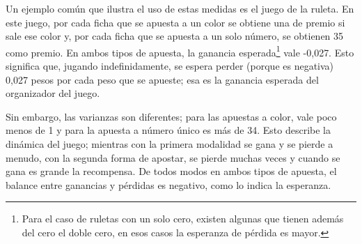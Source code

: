 \documentclass[]{article}
\let\rmarkdownfootnote\footnote%
\def\footnote{\protect\rmarkdownfootnote}
\begin{document}
Un ejemplo común que ilustra el uso de estas medidas es el juego de la
ruleta. En este juego, por cada ficha que se apuesta a un color se
obtiene una de premio si sale ese color y, por cada ficha que se apuesta
a un solo número, se obtienen 35 como premio. En ambos tipos de apuesta,
la ganancia esperada\footnote{Para el caso de ruletas con un solo cero,
  existen algunas que tienen además del cero el doble cero, en esos
  casos la esperanza de pérdida es mayor.} vale -0,027. Esto significa
que, jugando indefinidamente, se espera perder (porque es negativa)
0,027 pesos por cada peso que se apueste; esa es la ganancia esperada
del organizador del juego.

Sin embargo, las varianzas son diferentes; para las apuestas a color,
vale poco menos de 1 y para la apuesta a número único es más de 34. Esto
describe la dinámica del juego; mientras con la primera modalidad se
gana y se pierde a menudo, con la segunda forma de apostar, se pierde
muchas veces y cuando se gana es grande la recompensa. De todos modos en
ambos tipos de apuesta, el balance entre ganancias y pérdidas es
negativo, como lo indica la esperanza.
\end{document}
